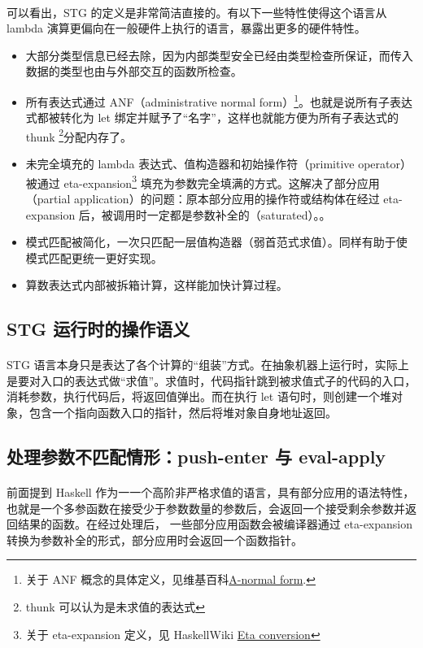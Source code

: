 \documentclass{article}
\begin{document}
	\paragraph{}
	可以看出，STG 的定义是非常简洁直接的。有以下一些特性使得这个语言从 lambda 演算更偏向在一般硬件上执行的语言，暴露出更多的硬件特性。
	\begin{itemize}
		\item 大部分类型信息已经去除，因为内部类型安全已经由类型检查所保证，而传入数据的类型也由与外部交互的函数所检查。
		\item 所有表达式通过 ANF（administrative normal form）\footnote{ 关于 ANF 概念的具体定义，见维基百科\href{https://en.wikipedia.org/wiki/A-normal_form}{A-normal form}.}。也就是说所有子表达式都被转化为 let 绑定并赋予了“名字”，这样也就能方便为所有子表达式的 thunk \footnote{thunk 可以认为是未求值的表达式}分配内存了。
		\item 未完全填充的 lambda 表达式、值构造器和初始操作符（primitive operator）被通过 eta-expansion\footnote{关于 eta-expansion 定义，见 HaskellWiki \href{https://wiki.haskell.org/Eta_conversion}{Eta conversion}} 填充为参数完全填满的方式。这解决了部分应用（partial application）的问题：原本部分应用的操作符或结构体在经过 eta-expansion 后，被调用时一定都是参数补全的（saturated）。。
		\item 模式匹配被简化，一次只匹配一层值构造器（弱首范式求值）。同样有助于使模式匹配更统一更好实现。
		\item 算数表达式内部被拆箱计算，这样能加快计算过程。
	\end{itemize}
	\subsection{STG 运行时的操作语义}
	\paragraph{}
	STG 语言本身只是表达了各个计算的“组装”方式。在抽象机器上运行时，实际上是要对入口的表达式做“求值”。求值时，代码指针跳到被求值式子的代码的入口，消耗参数，执行代码后，将返回值弹出。而在执行 let 语句时，则创建一个堆对象，包含一个指向函数入口的指针，然后将堆对象自身地址返回。
	\subsection{处理参数不匹配情形：push-enter 与 eval-apply\cite{make-fast-curry-pushenter-vs-evalapply}}
	\paragraph{}
	前面提到 Haskell 作为一一个高阶非严格求值的语言，具有部分应用的语法特性，也就是一个多参函数在接受少于参数数量的参数后，会返回一个接受剩余参数并返回结果的函数。在经过处理后， 一些部分应用函数会被编译器通过 eta-expansion 转换为参数补全的形式，部分应用时会返回一个函数指针。
\end{document}
